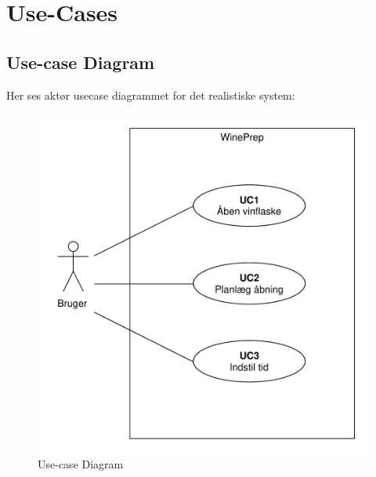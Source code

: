 
\section{Use-Cases}

\subsection{Use-case Diagram}
Her ses aktør usecase diagrammet for det realistiske system:
\begin{figure}[H]
\centering
\includegraphics[scale=0.5]{usecasediagram.pdf}
\caption[Figur]{Use-case Diagram}
\end{figure}

\newpage
